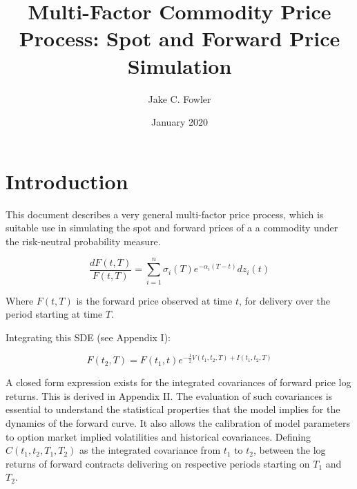 \documentclass{article}
\title{Multi-Factor Commodity Price Process: Spot and Forward Price Simulation}
\author{Jake C. Fowler}
\date{January 2020}
\begin{document}
\newcommand{\+}[1]{\ensuremath{\mathbf{#1}}}

\maketitle

\section{Introduction}
This document describes a very general multi-factor price process, which is suitable
use in simulating the spot and forward prices of a a commodity under the risk-neutral
probability measure.

\bigskip

\begin{equation}
    \label{eq:forward_sde}
    \frac{dF(t, T)}{F(t, T)}=\sum_{i=1}^n \sigma_i(T)e^{-\alpha_i(T-t)}dz_i(t)
\end{equation}

Where $F(t, T)$ is the forward price observed at time $t$, for delivery over the period
starting at time $T$.

\bigskip

Integrating this SDE (see Appendix I):

\begin{equation}
    \label{eq:forward_process_integrated}
    F(t_2, T) = F(t_1, t)e^{- \frac{1}{2} V(t_1, t_2, T) + I(t_1, t_2, T)}
\end{equation}

\bigskip

A closed form expression exists for the integrated covariances of
forward price log returns. This is derived in Appendix II. The evaluation of such 
covariances is essential to
understand the statistical properties that the model implies for the dynamics of 
the forward curve. It also allows the calibration of model parameters to option
market implied volatilities and historical covariances. 
Defining $C(t_1, t_2, T_1, T_2)$
as the integrated covariance from $t_1$ to $t_2$, between the log returns of forward 
contracts delivering on respective periods starting on $T_1$ and $T_2$.
\end{document}
